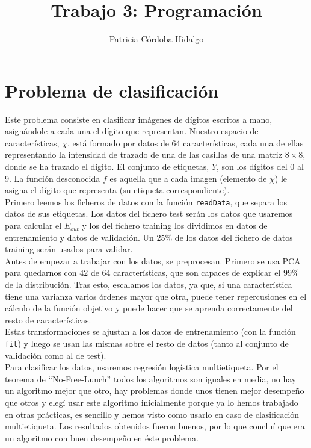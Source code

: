 \documentclass{article}
\begin{document}
\title{Trabajo 3: Programación}
\author{Patricia Córdoba Hidalgo}
\date{}
\maketitle

\tableofcontents

\section{Problema de clasificación}

Este problema consiste en clasificar imágenes de dígitos escritos a mano, asignándole a cada una el dígito que representan. Nuestro espacio de características, $\chi$, está formado por datos de 64 características, cada una de ellas representando la intensidad de trazado de una de las casillas de una matriz $8 \times 8$, donde se ha trazado el dígito. El conjunto de etiquetas, $Y$, son los dígitos del $0$ al $9$. La función desconocida $f$ es aquella que a cada imagen (elemento de $\chi$) le asigna el dígito que representa (su etiqueta correspondiente).\\

Primero leemos los ficheros de datos con la función \texttt{readData}, que separa los datos de sus etiquetas. Los datos del fichero test serán los datos que usaremos para calcular el $E_{out}$ y los del fichero training los dividimos en datos de entrenamiento y datos de validación. Un $25\%$ de los datos del fichero de datos training serán usados para validar.\\

Antes de empezar a trabajar con los datos, se preprocesan. Primero se usa PCA para quedarnos con $42$ de $64$ características, que son capaces de explicar el $99\%$ de la distribución. Tras esto, escalamos los datos, ya que, si una característica tiene una varianza varios órdenes mayor que otra, puede tener repercusiones en el cálculo de la función objetivo y puede hacer que se aprenda correctamente del resto de características.\\
Estas transformaciones se ajustan a los datos de entrenamiento (con la función \texttt{fit}) y luego se usan las mismas sobre el resto de datos (tanto al conjunto de validación como al de test).\\

Para clasificar los datos, usaremos regresión logística multietiqueta. Por el teorema de ``No-Free-Lunch'' todos los algoritmos son iguales en media, no hay un algoritmo mejor que otro, hay problemas donde unos tienen mejor desempeño que otros y elegí usar este algoritmo inicialmente porque ya lo hemos trabajado en otras prácticas, es sencillo y hemos visto como usarlo en caso de clasificación multietiqueta. Los resultados obtenidos fueron buenos, por lo que concluí que era un algoritmo con buen desempeño en éste problema.\\
\end{document}
